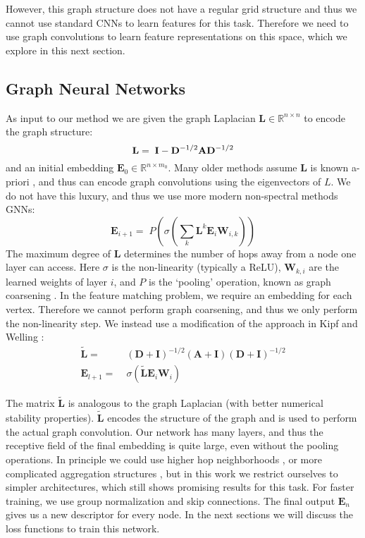 \documentclass[10pt,twocolumn,letterpaper]{article}
\newcommand{\bR}{\mathbb{R}}
\newcommand{\mat}[1]{\mathbf{#1}}
\begin{document}
However, this graph structure does not have a regular grid structure and thus we cannot use standard CNNs to learn features for this task.
Therefore we need to use graph convolutions to learn feature representations on this space, which we explore in this next section.

\subsection{Graph Neural Networks}
As input to our method we are given the graph Laplacian $\mat{L} \in \bR^{n \times n}$ to encode the graph structure:
\begin{equation}
  \mat{L} =\; \mat{I} - \mat{D}^{-1/2} \mat{A} \mat{D}^{-1/2} \\
\end{equation}
and an initial embedding $\mat{E}_0 \in \bR^{n \times m_0}$.
Many older methods assume $\mat{L}$ is known a-priori \cite{bruna2013spectral}, and thus can encode graph convolutions using the eigenvectors of $L$.
We do not have this luxury, and thus we use more modern non-spectral methods GNNs:
\begin{equation}
\mat{E}_{i+1} =\; P\left(\sigma\left( \sum_k \mat{L}^k \mat{E}_i \mat{W}_{i,k} \right)\right)
\end{equation}
The maximum degree of $\mat{L}$ determines the number of hops away from a node one layer can access.
Here $\sigma$ is the non-linearity (typically a ReLU), $\mat{W}_{k,i}$ are the learned weights of layer $i$,  and $P$ is the `pooling' operation, known as graph coarsening \cite{bronstein2017geometric, gama2018mimo}.
In the feature matching problem, we require an embedding for each vertex.
Therefore we cannot perform graph coarsening, and thus we only perform the non-linearity step.
We instead use a modification of the approach in Kipf and Welling \cite{kipf2016semi}:
\begin{align}
      \widetilde{\mat{L}} =&\; (\mat{D} + \mat{I})^{-1/2} (\mat{A} + \mat{I}) (\mat{D} + \mat{I})^{-1/2} \\
\mat{E}_{l+1} =&\; \sigma\left(\widetilde{\mat{L}} \mat{E}_i \mat{W}_i \right)  \label{eq:graph_conv}
\end{align}

The matrix $\widetilde{\mat{L}}$ is analogous to the graph Laplacian (with better numerical stability properties).
$\widetilde{\mat{L}}$ encodes the structure of the graph and is used to perform the actual graph convolution.
Our network has many layers, and thus the receptive field of the final embedding is quite large, even without the pooling operations.
In principle we could use higher hop neighborhoods \cite{gama2018convolutional}, or more complicated aggregation structures \cite{battaglia2018relational}, but in this work we restrict ourselves to simpler architectures, which still shows promising results for this task.
For faster training, we use group normalization \cite{wu2018group} and skip connections.
The final output $\mat{E}_n$ gives us a new descriptor for every node.
In the next sections we will discuss the loss functions to train this network.
\end{document}
